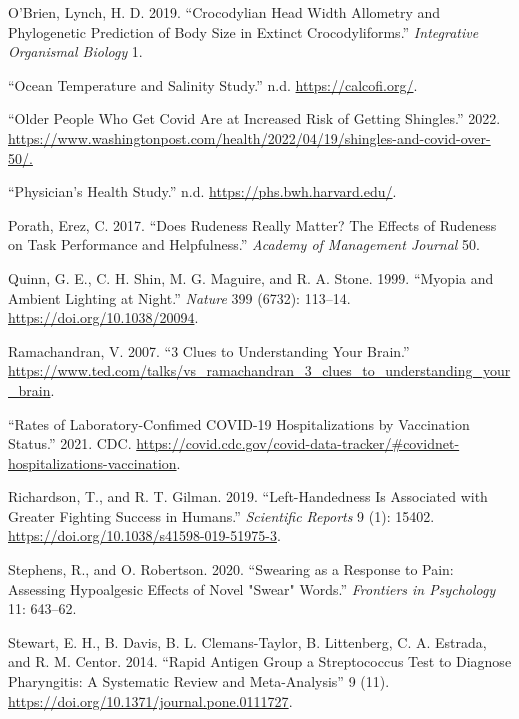 \documentclass[
]{report}
\newlength{\cslhangindent}
\newlength{\cslentryspacingunit} %
\newenvironment{CSLReferences}[2] %
 {%
  \setlength{\parindent}{0pt}
  \ifodd #1
  \let\oldpar\par
  \def\par{\hangindent=\cslhangindent\oldpar}
  \fi
  \setlength{\parskip}{#2\cslentryspacingunit}
 }%
 {}
\begin{document}
\begin{CSLReferences}{1}{0}
\leavevmode{}%
O'Brien, Lynch, H. D. 2019. {``Crocodylian Head Width Allometry and Phylogenetic Prediction of Body Size in Extinct Crocodyliforms.''} \emph{Integrative Organismal Biology} 1.

\leavevmode{}%
{``Ocean Temperature and Salinity Study.''} n.d. \url{https://calcofi.org/}.

\leavevmode{}%
{``Older People Who Get Covid Are at Increased Risk of Getting Shingles.''} 2022. \url{https://www.washingtonpost.com/health/2022/04/19/shingles-and-covid-over-50/.}

\leavevmode{}%
{``Physician's Health Study.''} n.d. \url{https://phs.bwh.harvard.edu/}.

\leavevmode{}%
Porath, Erez, C. 2017. {``Does Rudeness Really Matter? The Effects of Rudeness on Task Performance and Helpfulness.''} \emph{Academy of Management Journal} 50.

\leavevmode{}%
Quinn, G. E., C. H. Shin, M. G. Maguire, and R. A. Stone. 1999. {``Myopia and Ambient Lighting at Night.''} \emph{Nature} 399 (6732): 113--14. \url{https://doi.org/10.1038/20094}.

\leavevmode{}%
Ramachandran, V. 2007. {``3 Clues to Understanding Your Brain.''} \url{https://www.ted.com/talks/vs_ramachandran_3_clues_to_understanding_your_brain}.

\leavevmode{}%
{``Rates of Laboratory-Confimed COVID-19 Hospitalizations by Vaccination Status.''} 2021. CDC. \url{https://covid.cdc.gov/covid-data-tracker/\#covidnet-hospitalizations-vaccination}.

\leavevmode{}%
Richardson, T., and R. T. Gilman. 2019. {``Left-Handedness Is Associated with Greater Fighting Success in Humans.''} \emph{Scientific Reports} 9 (1): 15402. \url{https://doi.org/10.1038/s41598-019-51975-3}.

\leavevmode{}%
Stephens, R., and O. Robertson. 2020. {``Swearing as a Response to Pain: Assessing Hypoalgesic Effects of Novel "Swear" Words.''} \emph{Frontiers in Psychology} 11: 643--62.

\leavevmode{}%
Stewart, E. H., B. Davis, B. L. Clemans-Taylor, B. Littenberg, C. A. Estrada, and R. M. Centor. 2014. {``Rapid Antigen Group a Streptococcus Test to Diagnose Pharyngitis: A Systematic Review and Meta-Analysis''} 9 (11). \url{https://doi.org/10.1371/journal.pone.0111727}.


\end{CSLReferences}
\end{document}
